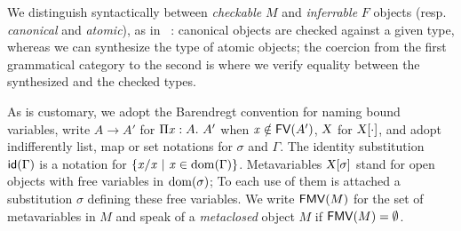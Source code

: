 \documentclass{llncs}
\begin{document}
We distinguish syntactically between \emph{checkable} $M$ and
\emph{inferrable} $F$ objects (resp. \emph{canonical} and
\emph{atomic}), as in \eg\ \cite{pierce2000local}:
canonical objects are checked against a given type, whereas we can
synthesize the type of atomic objects; the coercion from the first
grammatical category to the second is where we verify equality between
the synthesized and the checked types.

As is customary, we adopt the Barendregt convention for naming bound
variables, write $A\to A'$ for $\Pi{\ensuremath{\text{\textit{x}}}}:{A}.\  A'$ when $\text{\textit{x}}\notin
{\text{\textsf{FV}}}({A'})$, $\text{\textsl{X}}$ for ${\text{\textsl{X}}}[{\cdot}]$, and adopt indifferently
list, map or set notations for $\sigma$ and $\Gamma$. The identity
substitution ${\text{\textsf{id}}}({\Gamma})$ is a notation for $\{{\text{\textit{x}}}/{\text{\textit{x}}}\ |\ \text{\textit{x}} \in\operatorname{dom}{\!(\Gamma)}\}$. Metavariables ${\text{\textsl{X}}}[{\sigma}]$
stand for open objects with free variables in $\operatorname{dom}{\!(\sigma)}$; To each
use of them is attached a substitution $\sigma$ defining these free
variables. We write ${\text{\textsf{FMV}}}({M})$ for the set of metavariables in $M$ and
speak of a \emph{metaclosed} object $M$ if ${\text{\textsf{FMV}}}({M}) = \emptyset$.

\end{document}
